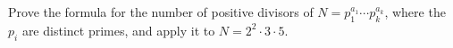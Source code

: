Prove the formula for the number of positive divisors of $ N=p_1^{a_1}\cdots p_k^{a_k}$, where the $ p_i $ are distinct primes, and apply it to $ N=2^2\cdot3\cdot5 $.
